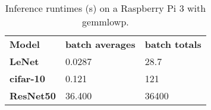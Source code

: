 \begin{table}[]
\centering
\caption[Raspberry Pi inference runtimes with (gemmlowp)]{Inference runtimes (s) on a Raspberry Pi 3 with gemmlowp.}
\label{tbl:runtimerpi}
\begin{tabular}{lll}

\textbf{Model}    & \textbf{batch averages}                   & \textbf{batch totals}                  \\
\textbf{LeNet}                      & 0.0287                        & 28.7          \\
\textbf{cifar-10}                 & 0.121                      & 121          \\
\textbf{ResNet50}              & 36.400                 & 36400       
\end{tabular}
\end{table}

